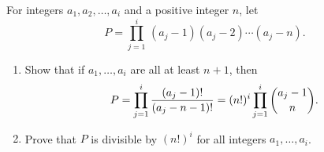 For integers $a_1,a_2,\dots,a_i$ and a positive integer $n$, let
\[P=\prod_{j=1}^{i}\,(a_j-1)(a_j-2)\cdots(a_j-n).\]
\begin{enumerate}
\item[(a)] Show that if $a_1,\dots,a_i$ are all at least $n+1$, then
\[P=\prod_{j=1}^{i}\dfrac{(a_j-1)!}{(a_j-n-1)!}=(n!)^i\prod_{j=1}^{i}\dbinom{a_j-1}{n}.\]
\item[(b)] Prove that $P$ is divisible by $(n!)^i$ for all integers $a_1,\dots,a_i$.
\end{enumerate}
